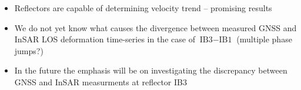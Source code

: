 \documentclass[a0, 18pt, landscape]{a0poster}
\begin{document}
\begin{multicols}{3}
\begin{mdframed}[style=block, frametitle={Discussion}]
    \begin{itemize}
        \item Reflectors are capable of determining velocity trend -- promising results
        \item We do not yet know what causes the divergence between measured GNSS and InSAR LOS deformation time-series in the case of $\text{IB3}-\text{IB1}$ (multiple phase jumps?)
        \item In the future the emphasis will be on investigating the discrepancy between GNSS and InSAR measurments at reflector IB3
    \end{itemize}
\end{mdframed}


\vspace{7pt}


\begin{mdframed}[style=ref]
    \normalfont\footnotesize
    
    
\end{mdframed}

\end{multicols}
\end{document}

